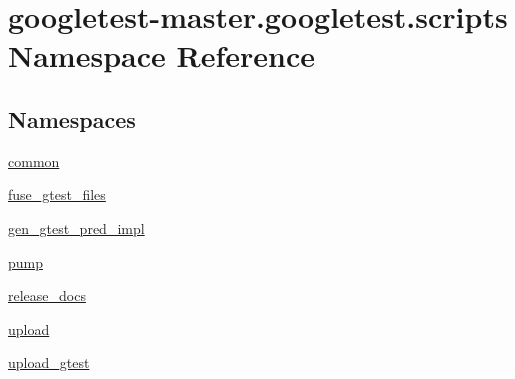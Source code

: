 \hypertarget{namespacegoogletest-master_1_1googletest_1_1scripts}{}\section{googletest-\/master.googletest.\+scripts Namespace Reference}
\label{namespacegoogletest-master_1_1googletest_1_1scripts}
\subsection*{Namespaces}
\begin{DoxyCompactItemize}
\item 
 \mbox{\hyperlink{namespacegoogletest-master_1_1googletest_1_1scripts_1_1common}{common}}
\item 
 \mbox{\hyperlink{namespacegoogletest-master_1_1googletest_1_1scripts_1_1fuse__gtest__files}{fuse\+\_\+gtest\+\_\+files}}
\item 
 \mbox{\hyperlink{namespacegoogletest-master_1_1googletest_1_1scripts_1_1gen__gtest__pred__impl}{gen\+\_\+gtest\+\_\+pred\+\_\+impl}}
\item 
 \mbox{\hyperlink{namespacegoogletest-master_1_1googletest_1_1scripts_1_1pump}{pump}}
\item 
 \mbox{\hyperlink{namespacegoogletest-master_1_1googletest_1_1scripts_1_1release__docs}{release\+\_\+docs}}
\item 
 \mbox{\hyperlink{namespacegoogletest-master_1_1googletest_1_1scripts_1_1upload}{upload}}
\item 
 \mbox{\hyperlink{namespacegoogletest-master_1_1googletest_1_1scripts_1_1upload__gtest}{upload\+\_\+gtest}}
\end{DoxyCompactItemize}
